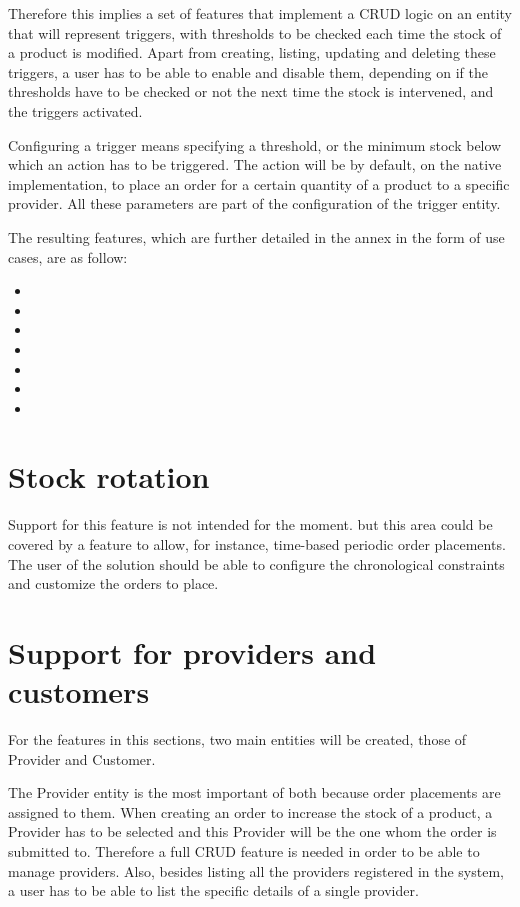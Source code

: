 Therefore this implies a set of features that implement a CRUD logic on an entity that will represent triggers, with thresholds to be checked each time the stock of a product is modified. Apart from creating, listing, updating and deleting these triggers, a user has to be able to enable and disable them, depending on if the thresholds have to be checked or not the next time the stock is intervened, and the triggers activated.

Configuring a trigger means specifying a threshold, or the minimum stock below which an action has to be triggered. The action will be by default, on the native implementation, to place an order for a certain quantity of a product to a specific provider. All these parameters are part of the configuration of the trigger entity.

The resulting features, which are further detailed in the annex in the form of use cases, are as follow:
\hfill\break
\begin{itemize}
\item {}
\item {}
\item {}
\item {}
\item {}
\item {}
\item {}
\end{itemize}
\hfill\break
\section{Stock rotation}
Support for this feature is not intended for the moment. but this area could be covered by a feature to allow, for instance, time-based periodic order placements. The user of the solution should be able to configure the chronological constraints and customize the orders to place.

\section{Support for providers and customers}
For the features in this sections, two main entities will be created, those of Provider and Customer.

The Provider entity is the most important of both because order placements are assigned to them. When creating an order to increase the stock of a product, a Provider has to be selected and this Provider will be the one whom the order is submitted to. Therefore a full CRUD feature is needed in order to be able to manage providers. Also, besides listing all the providers registered in the system, a user has to be able to list the specific details of a single provider.

